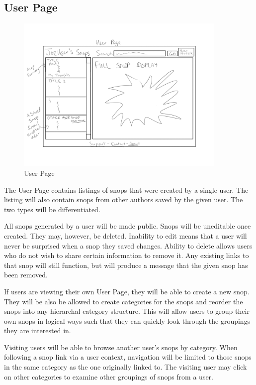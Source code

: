\documentclass[11pt]{article}
\begin{document}
\subsection{User Page}
\label{sec:user_page}
\begin{figure}[htb]
\begin{center}
\includegraphics[width=0.9\textwidth]{user_page.png}
\caption{User Page}
\label{fig:fig_user_page}
\end{center}
\end{figure}
The User Page contains listings of snops that were created by a single user. The listing will also contain snops from other authors saved by the given user. The two types will be differentiated. 

All snops generated by a user will be made public. Snops will be uneditable once created. They may, however, be deleted. Inability to edit means that a user will never be surprised when a snop they saved changes. Ability to delete allows users who do not wish to share certain information to remove it. Any existing links to that snop will still function, but will produce a message that the given snop has been removed. 

If users are viewing their own User Page, they will be able to create a new snop. They will be also be allowed to create categories for the snops and reorder the snops into any hierarchal category structure. This will allow users to group their own snops in logical ways such that they can quickly look through the groupings they are interested in.

Visiting users will be able to browse another user's snops by category. When following a snop link via a user context, navigation will be limited to those snops in the same category as the one originally linked to. The visiting user may click on other categories to examine other groupings of snops from a user.
\end{document}
